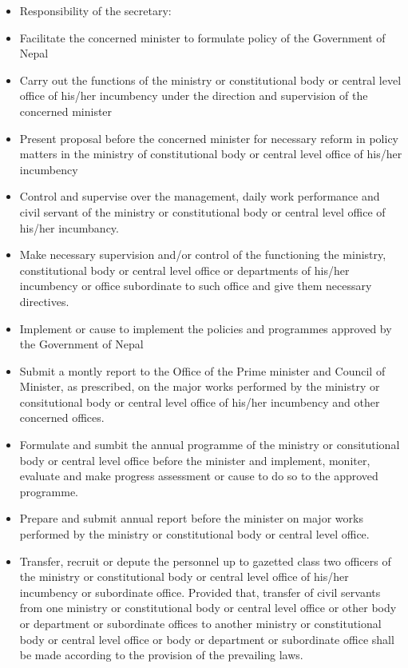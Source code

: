 \documentclass[
  openany]{book}
\providecommand{\tightlist}{%
  \setlength{\itemsep}{0pt}\setlength{\parskip}{0pt}}
\begin{document}
\begin{itemize}
\tightlist
\item
  Responsibility of the secretary:
\end{itemize}

\begin{itemize}
  \item Facilitate the concerned minister to formulate policy of the Government of Nepal
  \item Carry out the functions of the ministry or constitutional body or central level office of his/her incumbency under the direction and supervision of the concerned minister
  \item Present proposal before the concerned minister for necessary reform in policy matters in the ministry of constitutional body or central level office of his/her incumbency
  \item Control and supervise over the management, daily work performance and civil servant of the ministry or constitutional body or central level office of his/her incumbancy.
  \item Make necessary supervision and/or control of the functioning the ministry, constitutional body or central level office or departments of his/her incumbency or office subordinate to such office and give them necessary directives.
  \item Implement or cause to implement the policies and programmes approved by the Government of Nepal
  \item Submit a montly report to the Office of the Prime minister and Council of Minister, as prescribed, on the major works performed by the ministry or consitutional body or central level office of his/her incumbency and other concerned offices.
  \item Formulate and sumbit the annual programme of the ministry or consitutional body or central level office before the minister and implement, moniter, evaluate and make progress assessment or cause to do so to the approved programme.
  \item Prepare and submit annual report before the minister on major works performed by the ministry or constitutional body or central level office.
  \item Transfer, recruit or depute the personnel up to gazetted class two officers of the ministry or constitutional body or central level office of his/her incumbency or subordinate office. Provided that, transfer of civil servants from one ministry or constitutional body or central level office or other body or department or subordinate offices to another ministry or constitutional body or central level office or body or department or subordinate office shall be made according to the provision of the prevailing laws.

\end{itemize}
\end{document}
